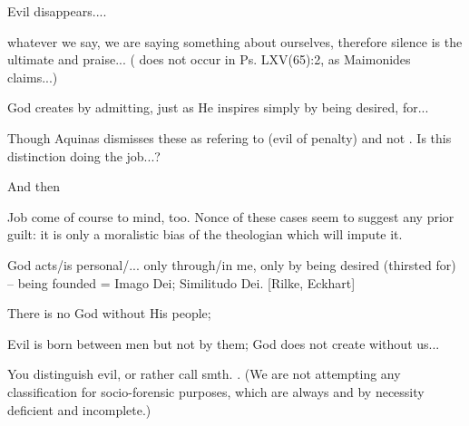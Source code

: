 Evil disappears....



\newpage
{}

whatever we say, we are saying something about ourselves, therefore silence is
the ultimate  and praise... ( does not
occur in Ps. LXV(65):2, as Maimonides claims...)



God creates by admitting, just as He inspires simply by being desired,
 for...

\kom {}
Though Aquinas dismisses these as refering to  (evil of
  penalty) and not . Is this distinction doing the job...?


And then 
      
Job come of course to mind, too. Nonce of these cases seem to suggest any prior
guilt: it is only a moralistic bias of the theologian which will impute it.
    
\kom
God acts/is personal/... only through/in me, only by being desired (thirsted
for) -- being founded \simu 
{} = Imago Dei;   \simu Similitudo Dei.
[Rilke, Eckhart]

There is no God without His people;

\kom
Evil is born between men but not by them; God does not create without us...

You distinguish evil, or rather call smth. . (We are not attempting any
classification for socio-forensic purposes, which are always and by necessity
deficient and incomplete.)

